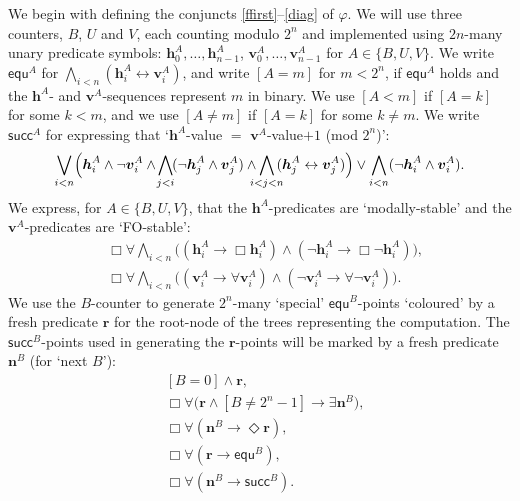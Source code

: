\documentclass[10pt,a4paper]{amsart}
\theoremstyle{plain}
\theoremstyle{definition}
\newcommand{\fform}[1]{\boldsymbol{#1}}
\newcommand{\hvar}{\fform{h}}
\newcommand{\vvar}{\fform{v}}
\newcommand{\cA}{A}
\newcommand{\cR}{B}
\newcommand{\cU}{U}
\newcommand{\cV}{V}
\newcommand{\cvf}[3]{[{#1}\mathop{#2}{#3}]}
\newcommand{\nextR}{\fform{n}^\cR}
\newcommand{\Bv}{\forall}
\newcommand{\Bh}{\Box}
\newcommand{\Dv}{\exists}
\newcommand{\Dh}{\Diamond}
\newcommand{\start}{\fform{r}}
\newcommand{\grid}{\mathsf{equ}}
\newcommand{\scc}{\mathsf{succ}}
\begin{document}
	We begin with defining the conjuncts \eqref{ffirst}--\eqref{diag} of $\varphi$.
	We will use three counters, $\cR$, $\cU$ and $\cV$,
	each counting modulo $2^n$ and implemented using $2n$-many unary predicate symbols:
	$\hvar_0^\cA,\dots,\hvar_{n-1}^\cA$, $\vvar_0^\cA,\dots,\vvar_{n-1}^\cA$ for $\cA\in \{\cR,\cU,\cV\}$.
	We write $\grid^\cA$ for $\bigwedge_{i<n}(\hvar_i^\cA\leftrightarrow \vvar_i^\cA)$, and write
	$\cvf{\cA}{=}{m}$
	for $m<2^n$, if $\grid^\cA$ holds and the $\hvar^\cA$- and $\vvar^\cA$-sequences represent $m$ in binary. 
	We use $\cvf{\cA}{<}{m}$ if $\cvf{\cA}{=}{k}$ for some $k<m$, and we use
	$\cvf{\cA}{\ne}{m}$ if $\cvf{\cA}{=}{k}$ for some $k\not=m$. 
	We write $\scc^\cA$ for expressing that `$\hvar^\cA$-value $=$ $\vvar^\cA$-value$+1$ (mod $2^n$)':
	$$
	\bigvee_{i<n}\Bigl(\hvar_i^\cA\land \neg \vvar_i^\cA\land
	\!\bigwedge_{j<i}\!(\neg \hvar_j^\cA\land \vvar_j^\cA)\land
	\!\!\!\!\bigwedge_{i<j<n}\!\!\!(\hvar_j^\cA\leftrightarrow \vvar_j^\cA)\Bigr) 
	\lor \bigwedge_{i<n}(\neg\hvar_i^\cA\land\vvar_i^\cA).
	$$
	We express, for $\cA\in\{\cR,\cU,\cV\}$, that the $\hvar^\cA$-predicates are `modally-stable' and the $\vvar^\cA$-predicates are
	`FO-stable':
	\begin{align}
		\label{ffirst}
		& \Bh\Bv\bigwedge_{i<n}\bigl((\hvar_i^\cA\to\Bh \hvar_i^\cA)\land(\neg \hvar_i^\cA\to\Bh\neg \hvar_i^\cA)\bigr),\\
		\label{vstable}
		& \Bh\Bv\bigwedge_{i<n}\bigl((\vvar_i^\cA\to\Bv \vvar_i^\cA)\land(\neg \vvar_i^\cA\to\Bv\neg \vvar_i^\cA)\bigr).
	\end{align}
	We use the $\cR$-counter to generate $2^n$-many `special' $\grid^\cR$-points `coloured' by a fresh predicate $\start$ for the root-node of the trees representing the computation. The $\scc^\cR$-points used in generating the $\start$-points will be marked by a fresh predicate $\nextR$ (for `next $\cR$'):
	\begin{align}
		\label{root}
		& \cvf{\cR}{=}{0}\land\start,\\
		& \Bh\Bv \bigl(\start\land\cvf{\cR}{\ne}{2^n-1}\to \Dv\nextR\bigr),\\
		\label{flast}
		& \Bh\Bv (\nextR\to\Dh\start),\\
%	
		& \Bh\Bv(\start\to\grid^\cR),\\
		\label{genlast}
		& \Bh\Bv(\nextR\to\scc^\cR).
	\end{align}
\end{document}
